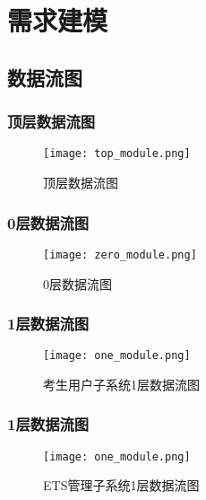 \chapter{需求建模 }
\section{数据流图}
\subsection{顶层数据流图}
\begin{figure}[ht]
\centering
\texttt{[image: top\_module.png]}
\caption{顶层数据流图}\label{fig:noted-figure}
\end{figure}


\subsection{0层数据流图}
\begin{figure}[htb]
\centering
\texttt{[image: zero\_module.png]}
\caption{0层数据流图}\label{fig:noted-figure}
\end{figure}

\subsection{1层数据流图}
\begin{figure}[htb]
\centering
\texttt{[image: one\_module.png]}
\caption{考生用户子系统1层数据流图}\label{fig:noted-figure}
\end{figure}

\subsection{1层数据流图}
\begin{figure}[htb]
\centering
\texttt{[image: one\_module.png]}
\caption{ETS管理子系统1层数据流图}\label{fig:noted-figure}
\end{figure}


